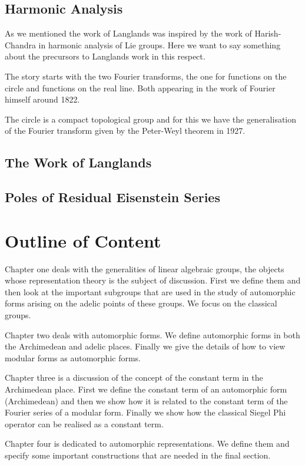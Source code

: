 \subsection{Harmonic Analysis}
As we mentioned the work of Langlands was inspired by the work of Harish-Chandra in harmonic analysis of Lie groups. Here we want to say something about the precursors to Langlands work in this respect. 

The story starts with the two Fourier transforms, the one for functions on the circle and functions on the real line. Both appearing in the work of Fourier himself around 1822. 

The circle is a compact topological group and for this we have the generalisation of the Fourier transform given by the Peter-Weyl theorem in 1927.

\subsection{The Work of Langlands}

\subsection{Poles of Residual Eisenstein Series}

\section*{Outline of Content}
Chapter one deals with the generalities of linear algebraic groups, the objects whose representation theory is the subject of discussion. First we define them and then look at the important subgroups that are used in the study of automorphic forms arising on the adelic points of these groups. We focus on the classical groups.

Chapter two deals with automorphic forms. We define automorphic forms in both the Archimedean and adelic places. Finally we give the details of how to view modular forms as automorphic forms. 

Chapter three is a discussion of the concept of the constant term in the Archimedean place. First we define the constant term of an automorphic form (Archimedean) and then we show how it is related to the constant term of the Fourier series of a modular form. Finally we show how the classical Siegel Phi operator can be realised as a constant term.

Chapter four is dedicated to automorphic representations. We define them and specify some important constructions that are needed in the final section.

